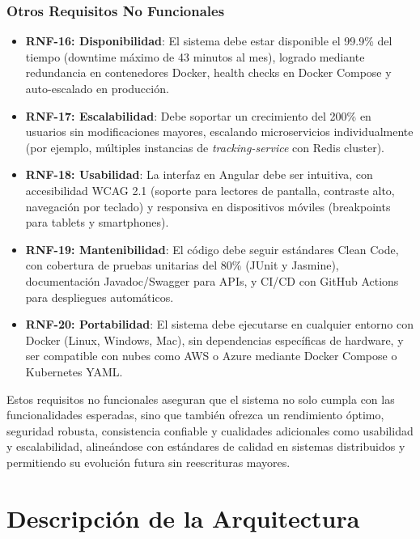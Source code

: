 \documentclass[a4paper,12pt]{article}
\begin{document}
\subsubsection{Otros Requisitos No Funcionales}
\begin{itemize}
    \item \textbf{RNF-16: Disponibilidad}: El sistema debe estar disponible el 99.9\% del tiempo (downtime máximo de 43 minutos al mes), logrado mediante redundancia en contenedores Docker, health checks en Docker Compose y auto-escalado en producción.
    
    \item \textbf{RNF-17: Escalabilidad}: Debe soportar un crecimiento del 200\% en usuarios sin modificaciones mayores, escalando microservicios individualmente (por ejemplo, múltiples instancias de \textit{tracking-service} con Redis cluster).
    
    \item \textbf{RNF-18: Usabilidad}: La interfaz en Angular debe ser intuitiva, con accesibilidad WCAG 2.1 (soporte para lectores de pantalla, contraste alto, navegación por teclado) y responsiva en dispositivos móviles (breakpoints para tablets y smartphones).
    
    \item \textbf{RNF-19: Mantenibilidad}: El código debe seguir estándares Clean Code, con cobertura de pruebas unitarias del 80\% (JUnit y Jasmine), documentación Javadoc/Swagger para APIs, y CI/CD con GitHub Actions para despliegues automáticos.
    
    \item \textbf{RNF-20: Portabilidad}: El sistema debe ejecutarse en cualquier entorno con Docker (Linux, Windows, Mac), sin dependencias específicas de hardware, y ser compatible con nubes como AWS o Azure mediante Docker Compose o Kubernetes YAML.
\end{itemize}

Estos requisitos no funcionales aseguran que el sistema no solo cumpla con las funcionalidades esperadas, sino que también ofrezca un rendimiento óptimo, seguridad robusta, consistencia confiable y cualidades adicionales como usabilidad y escalabilidad, alineándose con estándares de calidad en sistemas distribuidos y permitiendo su evolución futura sin reescrituras mayores.
\section{Descripción de la Arquitectura}
\end{document}
